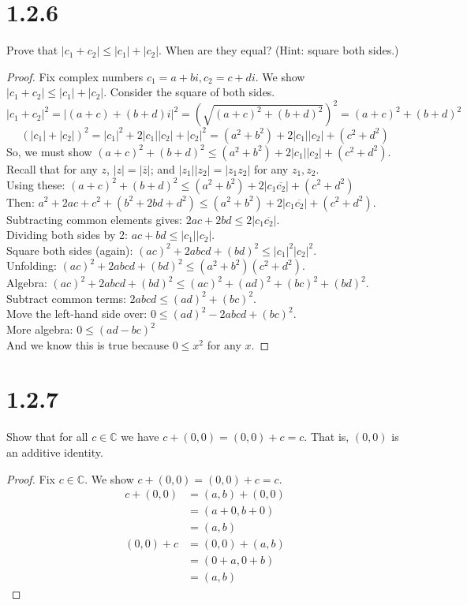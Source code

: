 \documentclass[11pt]{article}
\begin{document}
\section{1.2.6}
Prove that $|c_1 + c_2| \leq |c_1| + |c_2|$. When are they equal? (Hint: square both sides.)
\begin{proof}
	Fix complex numbers $c_1 = a+bi, c_2 = c+di$. We show $|c_1 + c_2| \leq |c_1| + |c_2|$.
	Consider the square of both sides. 
	$$|c_1 + c_2|^2 = |(a+c) + (b+d)i|^2 = (\sqrt{(a+c)^2 + (b+d)^2})^2 = (a+c)^2 + (b+d)^2$$
	$$(|c_1| + |c_2|)^2 = |c_1|^2 + 2|c_1||c_2| + |c_2|^2 = (a^2 + b^2) + 2|c_1||c_2| + (c^2 + d^2)$$
	So, we must show $(a+c)^2 + (b+d)^2 \leq (a^2 + b^2) + 2|c_1||c_2| + (c^2 + d^2)$.  \\
	Recall that for any $z$, $|z| = |\overline{z}|$; and $|z_1||z_2| = |z_1z_2|$ for any $z_1, z_2$. \\
	Using these: $(a+c)^2 + (b+d)^2 \leq (a^2 + b^2) + 2|c_1 \overline{c_2}| + (c^2 + d^2)$ \\
	Then:  $a^2 + 2ac + c^2 + (b^2 + 2bd + d^2) \leq (a^2 + b^2) + 2|c_1 \overline{c_2}| + (c^2 + d^2)$. \\
	Subtracting common elements gives:  $2ac + 2bd \leq 2|c_1 \overline{c_2}|$. \\
	Dividing both sides by 2:  $ac + bd \leq |c_1||c_2|$. \\
	Square both sides (again):  $(ac)^2 + 2abcd + (bd)^2 \leq |c_1|^2|c_2|^2$. \\
	Unfolding:  $(ac)^2 + 2abcd + (bd)^2 \leq (a^2 + b^2)(c^2 + d^2)$. \\
	Algebra:  $(ac)^2 + 2abcd + (bd)^2 \leq (ac)^2 + (ad)^2 + (bc)^2 + (bd)^2$. \\
	Subtract common terms:  $2abcd \leq (ad)^2 + (bc)^2$. \\
	Move the left-hand side over:  $0 \leq (ad)^2 - 2abcd + (bc)^2$. \\
	More algebra:  $0 \leq (ad - bc)^2$ \\
	And we know this is true because $0 \leq x^2$ for any $x$.
\end{proof}



\section{1.2.7}
Show that for all $c \in \mathbb{C}$ we have $c + (0,0) = (0,0) + c = c$. 
That is, $(0,0)$ is an additive identity.

\begin{proof} Fix $c \in \mathbb{C}$. We show $c + (0,0) = (0,0) + c = c$. 
\begin{align*}
	c + (0,0) &= (a,b) + (0,0) \\
	          &= (a + 0, b + 0) \\
		  &= (a,b)
\end{align*}
\begin{align*}
	(0,0) + c &= (0,0) + (a,b) \\ 
		  &= (0 + a, 0 + b) \\
		  &= (a,b)
\end{align*}

\end{proof}
\end{document}
